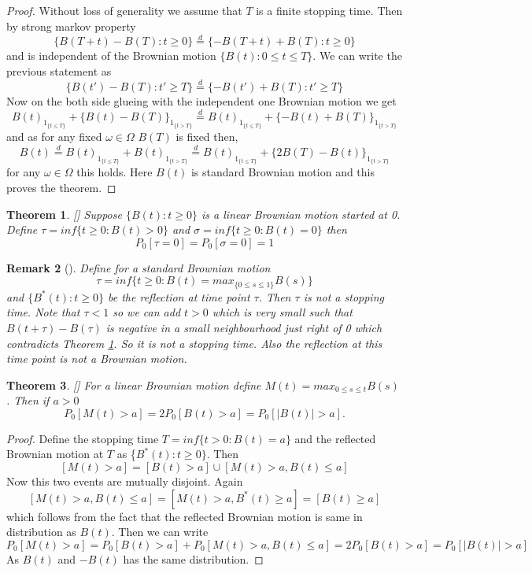 \documentclass[11pt, a4paper, oneside]{report}
\numberwithin{equation}{section}
\newtheorem{theorem}{Theorem}[chapter]
\newtheorem{remark}[theorem]{Remark}
\begin{document}
\begin{proof}
Without loss of generality we assume that \(T\) is a finite stopping time. Then by strong markov property 
\[
\{B(T+t)-B(T) : t \geq 0\} \overset{d}{=} \{-B(T+t)+B(T) : t \geq 0\} 
\]
and is independent of the Brownian motion \(\{B(t) : 0 \leq t \leq T\}\). We can write the previous statement as 
\[
\{B(t')-B(T) : t' \geq T\} \overset{d}{=} \{-B(t')+B(T) : t' \geq T\} 
\]
Now on the both side glueing with the independent one Brownian motion we get 
\[
B(t)_{1_{\{t \leq T\}}}+\{B(t)-B(T) \}_{1_{\{t > T\}}}\overset{d}{=} B(t)_{1_{\{t \leq T\}}}+\{-B(t)+B(T) \}_{1_{\{t > T\}}} 
\]
and as for any fixed $\omega \in \Omega$ $B(T)$ is fixed then,
\[B(t)\overset{d}{=}
B(t)_{1_{\{t \leq T\}}}+B(t)_{1_{\{t > T\}}}\overset{d}{=} B(t)_{1_{\{t \leq T\}}}+\{2B(T)-B(t) \}_{1_{\{t > T\}}} 
\]
for any $\omega \in \Omega$ this holds. Here \(B(t)\) is standard Brownian motion and this proves the theorem.

\end{proof}
\begin{theorem}\label{lbm}[{\cite[Theorem 2.8]{PeresMortersBook}}]
Suppose \(\{B(t) : t \geq 0\}\) is a linear Brownian motion started at 0. Define \(\tau=inf\{t \geq 0 : B(t) > 0\}\) and \(\sigma=inf\{t \geq 0 : B(t) = 0\}\) then 
\[
P_0[\tau =0]=P_0[\sigma =0]=1
\]
\end{theorem}
\begin{remark}[{\cite[Remark 2.20]{PeresMortersBook}}]
Define for a standard Brownian motion 
\[
\tau=inf\{t \geq 0 : B(t)= max_{\{0 \leq s \leq 1\}}B(s)\}
\]
and \(\{B^*(t): t \geq 0\}\) be the reflection at time point \(\tau\). Then \(\tau\) is not a stopping time. Note that \(\tau < 1\) so we can add \(t > 0\) which is very small such that \(B(t+\tau)-B(\tau)\) is negative in a small neighbourhood just right of 0 which contradicts Theorem \ref{lbm}. So it is not a stopping time. Also the reflection at this time point is not a Brownian motion.
\end{remark}
\begin{theorem}\label{maximum-theorem}[{\cite[Theorem 2.21]{PeresMortersBook}}]
For a linear Brownian motion define \(M(t)=max_{0 \leq s \leq t}B(s)\). Then if \(a > 0\) 
\[
P_0[M(t)>a]=2P_0[B(t) > a]=P_0[|B(t)|>a].
\]
\end{theorem}
\begin{proof}
Define the stopping time \(T=inf\{t > 0 : B(t)=a\}\) and the reflected Brownian motion at \(T\) as \{\(B^*(t) : t \geq 0\}\). Then
\[
[M(t)>a]=[B(t)>a]\cup [M(t)>a,B(t) \leq a]
\]
Now this two events are mutually disjoint. 
\noindent Again
\[
[M(t)>a,B(t) \leq a] = [M(t)>a,B^*(t) \geq a]=[B(t) \geq a]
\]
which follows from the fact that the reflected Brownian motion is same in distribution as $B(t)$. Then we can write  
\[
P_0[M(t)>a]=P_0[B(t)>a]+P_0[M(t)>a,B(t) \leq a]= 2P_0[B(t)>a]=P_0[|B(t)|>a]
\]
As $B(t)$ and $-B(t)$ has the same distribution.
\end{proof}
\end{document}
